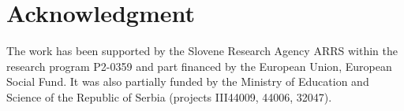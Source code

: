 \documentclass[conference]{IEEEtran}
\begin{document}


\section*{Acknowledgment}
The work has been supported by the Slovene Research Agency ARRS within the research program P2-0359 and part financed by the European Union, European Social Fund. It was also partially funded by the Ministry of Education and Science of the Republic of Serbia (projects III44009, 44006, 32047).







%
%
%






\end{document}
